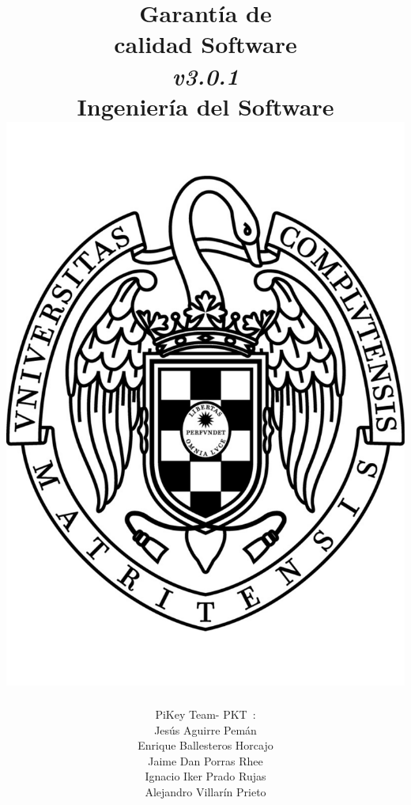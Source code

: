 \documentclass[spanish,a4paper,11pt, twoside]{report}	%
\newcommand*{\PKT}{\hbox{P}\kern-2.5pt\lower3.5pt\hbox{\small{K}}\kern-2.8pt\hbox{T}\kern-2pt}	%
\begin{document}
\renewcommand{\chaptername}{Parte}			%
\renewcommand{\thechapter}{\Roman{chapter}}	%

\title{\textbf{\huge{Garantía de \\ 
	calidad Software}} \\ 
	\textit{v3.0.1} \\	\vspace{0.1cm}
	\Large{Ingeniería del Software} \\
	\includegraphics[scale=0.3]{ucm.pdf}}
\author{{\Large{PiKey Team-}} \PKT \ : \vspace{0.2cm} \\
	Jesús Aguirre Pemán \\
	 Enrique Ballesteros Horcajo \\
	 Jaime Dan Porras Rhee \\
	 Ignacio Iker Prado Rujas \\
	 Alejandro Villarín Prieto }
\date{\Today}
\maketitle
\end{document}
